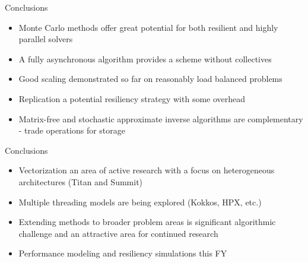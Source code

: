 \documentclass{beamer}
\begin{document}
\begin{frame}{Conclusions}
  \begin{itemize}
  \item Monte Carlo methods offer great potential for both resilient and
    highly parallel solvers
    \vfill
  \item A fully asynchronous algorithm provides a scheme without collectives 
    \vfill
  \item Good scaling demonstrated so far on reasonably load balanced problems
    \vfill
  \item Replication a potential resiliency strategy with some overhead
    \vfill
  \item Matrix-free and stochastic approximate inverse algorithms are
    complementary - trade operations for storage
  \end{itemize}
\end{frame}

\begin{frame}{Conclusions}
  \begin{itemize}
  \item Vectorization an area of active research with a focus on heterogeneous
    architectures (Titan and Summit)
    \vfill
  \item Multiple threading models are being explored (Kokkos, HPX, etc.)
    \vfill
  \item Extending methods to broader problem areas is significant algorithmic
    challenge and an attractive area for continued research
    \vfill
  \item Performance modeling and resiliency simulations this FY
  \end{itemize}
\end{frame}

\end{document}
